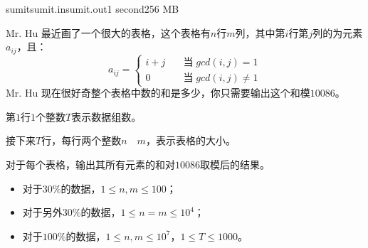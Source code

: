 \documentclass[11pt,a4paper,oneside]{article}
\begin{document}
\begin{problem}{sumit}{sumit.in}{sumit.out}{1 second}{256 MB}
	
	Mr. Hu 最近画了一个很大的表格，这个表格有$n$行$m$列，其中第$i$行第$j$列的为元素$a_{ij}$，且：
	$$
		a_{ij} = \begin{cases}
			i + j & \quad \text{当} \; gcd(i,j) = 1 \\
			0 & \quad \text{当}\; gcd(i,j) \neq 1
		\end{cases}
	$$
	Mr. Hu 现在很好奇整个表格中数的和是多少，你只需要输出这个和模$10086$。

    \InputFile

	第$1$行$1$个整数$T$表示数据组数。

	接下来$T$行，每行两个整数$n \quad m$，表示表格的大小。
	
    \OutputFile
    
    对于每个表格，输出其所有元素的和对$10086$取模后的结果。
    
    \Example    
    \begin{example}
   \end{example}
   
   \Note
   
   \begin{itemize}
	   	\item 对于$30\%$的数据，$1 \leq n, m \leq 100$；
	   	\item 对于另外$30\%$的数据，$1 \leq n = m \leq 10^4$；
	   	\item 对于$100\%$的数据，$1 \leq n, m \leq 10^7$，$1 \leq T \leq 1000$。
   \end{itemize}
\end{problem}	
	
\end{document}
